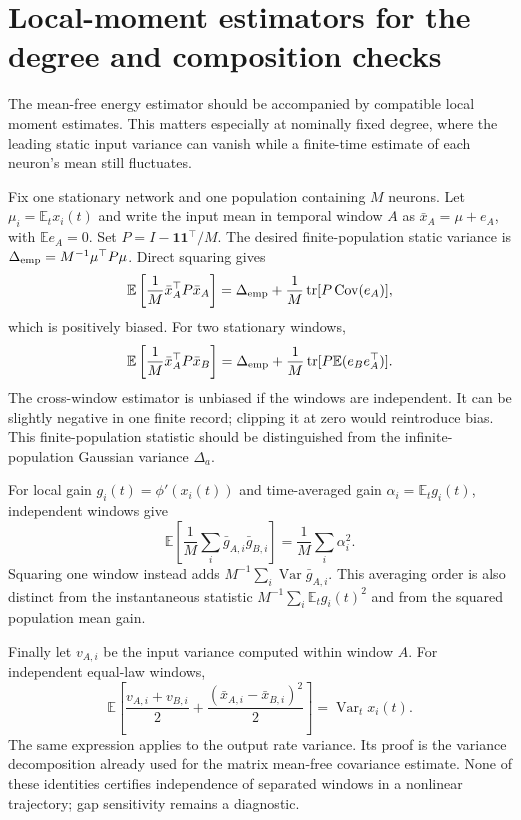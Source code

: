 \section{Local-moment estimators for the degree and composition checks}
The mean-free energy estimator should be accompanied by compatible local
moment estimates. This matters especially at nominally fixed degree, where
the leading static input variance can vanish while a finite-time estimate
of each neuron's mean still fluctuates.

Fix one stationary network and one population containing $M$ neurons.
Let $\mu_i=\mathbb E_t x_i(t)$ and write the input mean in temporal window
$A$ as $\bar x_A=\mu+e_A$, with $\mathbb E e_A=0$. Set
$P=I-\mathbf1\mathbf1^\top/M$. The desired finite-population static
variance is $\Delta_{\rm emp}=M^{-1}\mu^\top P\mu$. Direct squaring gives
\[
 \mathbb E\left[\frac1M\bar x_A^\top P\bar x_A\right]
 =\Delta_{\rm emp}+\frac1M\operatorname{tr}
       [P\operatorname{Cov}(e_A)],
\]
which is positively biased. For two stationary windows,
\[
 \mathbb E\left[\frac1M\bar x_A^\top P\bar x_B\right]
 =\Delta_{\rm emp}+\frac1M\operatorname{tr}
       [P\mathbb E(e_Be_A^\top)].
\]
The cross-window estimator is unbiased if the windows are independent.
It can be slightly negative in one finite record; clipping it at zero would
reintroduce bias. This finite-population statistic should be distinguished
from the infinite-population Gaussian variance $\Delta_a$.

For local gain $g_i(t)=\phi'(x_i(t))$ and time-averaged gain
$\alpha_i=\mathbb E_tg_i(t)$, independent windows give
\[
 \mathbb E\left[\frac1M\sum_i\bar g_{A,i}\bar g_{B,i}\right]
 =\frac1M\sum_i\alpha_i^2.
\]
Squaring one window instead adds $M^{-1}\sum_i\operatorname{Var}\bar g_{A,i}$.
This averaging order is also distinct from the instantaneous statistic
$M^{-1}\sum_i\mathbb E_t g_i(t)^2$ and from the squared population mean gain.

Finally let $v_{A,i}$ be the input variance computed within window $A$.
For independent equal-law windows,
\[
 \mathbb E\left[\frac{v_{A,i}+v_{B,i}}2+
                 \frac{(\bar x_{A,i}-\bar x_{B,i})^2}{2}\right]
 =\operatorname{Var}_t x_i(t).
\]
The same expression applies to the output rate variance. Its proof is the
variance decomposition already used for the matrix mean-free covariance
estimate. None of these identities certifies independence of separated
windows in a nonlinear trajectory; gap sensitivity remains a diagnostic.
